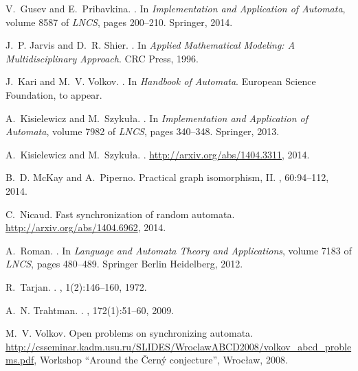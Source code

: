 \documentclass[runningheads]{llncs}
\begin{document}
\begin{thebibliography}{10}
V.~Gusev and E.~Pribavkina.
.
\newblock In {\em Implementation and Application of Automata}, volume 8587 of
  {\em LNCS}, pages 200--210. Springer, 2014.

J.~P. Jarvis and D.~R. Shier.
.
\newblock In {\em Applied Mathematical Modeling: A Multidisciplinary Approach}.
  CRC Press, 1996.

J.~Kari and M.~V. Volkov.
.
\newblock In {\em Handbook of Automata}. European Science Foundation, to
  appear.

A.~Kisielewicz and M.~Szyku{\l}a.
.
\newblock In {\em Implementation and Application of Automata}, volume 7982 of
  {\em LNCS}, pages 340--348. Springer, 2013.

A.~Kisielewicz and M.~Szyku{\l}a.
.
\newblock \url{http://arxiv.org/abs/1404.3311}, 2014.

B.~D. McKay and A.~Piperno.
\newblock Practical graph isomorphism, {II}.
, 60:94--112, 2014.

C.~Nicaud.
\newblock Fast synchronization of random automata.
\newblock \url{http://arxiv.org/abs/1404.6962}, 2014.

A.~Roman.
.
\newblock In {\em Language and Automata Theory and Applications}, volume 7183
  of {\em LNCS}, pages 480--489. Springer Berlin Heidelberg, 2012.

R.~Tarjan.
.
, 1(2):146--160, 1972.

A.~N. Trahtman.
.
, 172(1):51--60, 2009.

M.~V. Volkov.
\newblock Open problems on synchronizing automata.
\newblock
  \small\url{http://csseminar.kadm.usu.ru/SLIDES/WroclawABCD2008/volkov_abcd_problems.pdf},
  Workshop ``Around the {\v{C}ern\'{y}} conjecture'', Wroc{\l}aw, 2008.


\end{thebibliography}
\end{document}
